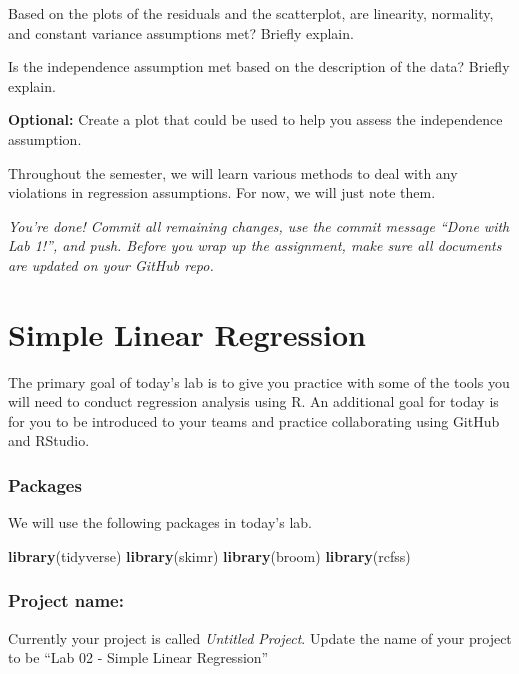 \documentclass[]{book}
\newenvironment{Shaded}{\begin{snugshade}}{\end{snugshade}}
\newcommand{\KeywordTok}[1]{\textcolor[rgb]{0.13,0.29,0.53}{\textbf{#1}}}
\newcommand{\NormalTok}[1]{#1}
\begin{document}
Based on the plots of the residuals and the scatterplot, are linearity,
normality, and constant variance assumptions met? Briefly explain.

Is the independence assumption met based on the description of the data?
Briefly explain.

\textbf{Optional:} Create a plot that could be used to help you assess
the independence assumption.

Throughout the semester, we will learn various methods to deal with any
violations in regression assumptions. For now, we will just note them.

\emph{You're done! Commit all remaining changes, use the commit message
``Done with Lab 1!'', and push. Before you wrap up the assignment, make
sure all documents are updated on your GitHub repo.}

\chapter{Simple Linear Regression}\label{slr}

The primary goal of today's lab is to give you practice with some of the
tools you will need to conduct regression analysis using R. An
additional goal for today is for you to be introduced to your teams and
practice collaborating using GitHub and RStudio.

\subsection{Packages}\label{packages-1}

We will use the following packages in today's lab.

\begin{Shaded}
\begin{Highlighting}[]
\KeywordTok{library}\NormalTok{(tidyverse)}
\KeywordTok{library}\NormalTok{(skimr)}
\KeywordTok{library}\NormalTok{(broom)}
\KeywordTok{library}\NormalTok{(rcfss)}
\end{Highlighting}
\end{Shaded}

\subsection{Project name:}\label{project-name-1}

Currently your project is called \emph{Untitled Project}. Update the
name of your project to be ``Lab 02 - Simple Linear Regression''
\end{document}
